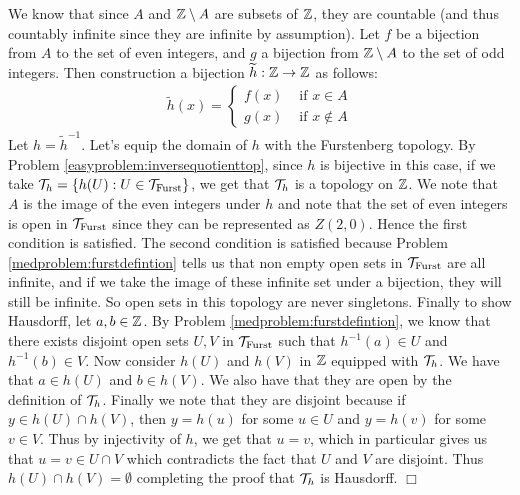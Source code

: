 \documentclass{article}
\begin{document}
 {
    We know that since $A$ and $\mathbb{Z}\setminus A$ are subsets of $\mathbb{Z}$, they are countable (and thus countably infinite since they are infinite by assumption). Let $f$ be a bijection from $A$ to the set of even integers, and $g$ a bijection from $\mathbb{Z}\setminus A$ to the set of odd integers. Then construction a bijection $\widetilde{h}: \mathbb{Z}\to \mathbb{Z}$ as follows:
    \begin{align*}
        \widetilde{h}(x) = \begin{cases}
            f(x) &\text{ if }x\in A\\
            g(x) &\text{ if }x\not\in A
        \end{cases}
    \end{align*}
    Let $h = \widetilde{h}^{-1}$. Let's equip the domain of $h$ with the Furstenberg topology. By Problem \ref{easyproblem:inversequotienttop}, since $h$ is bijective in this case, if we take $\mathcal{T}_{h} = \{h(U): U\in \mathcal{T}_{\text{Furst}}\}$, we get that $\mathcal{T}_{h}$ is a topology on $\mathbb{Z}$. We note that $A$ is the image of the even integers under $h$ and note that the set of even integers is open in $\mathcal{T}_{\text{Furst}}$ since they can be represented as $Z(2,0)$. Hence the first condition is satisfied. The second condition is satisfied because Problem \ref{medproblem:furstdefintion} tells us that non empty open sets in $\mathcal{T}_{\text{Furst}}$ are all infinite, and if we take the image of these infinite set under a bijection, they will still be infinite. So open sets in this topology are never singletons. Finally to show Hausdorff, let $a,b\in \mathbb{Z}$. By Problem \ref{medproblem:furstdefintion}, we know that there exists disjoint open sets $U,V$ in $\mathcal{T}_{\text{Furst}}$ such that $h^{-1}(a)\in U$ and $h^{-1}(b)\in V$. Now consider $h(U)$ and $h(V)$ in $\mathbb{Z}$ equipped with $\mathcal{T}_{h}$. We have that $a\in h(U)$ and $b\in h(V)$. We also have that they are open by the definition of $\mathcal{T}_{h}$. Finally we note that they are disjoint because if $y \in h(U)\cap h(V)$, then $y = h(u)$ for some $u\in U$ and $y = h(v)$ for some $v\in V$. Thus by injectivity of $h$, we get that $u = v$, which in particular gives us that $u=v \in U\cap V$ which contradicts the fact that $U$ and $V$ are disjoint. Thus $h(U)\cap h(V) = \emptyset$ completing the proof that $\mathcal{T}_{h}$ is Hausdorff. $\Box$ 
}
\end{document}
